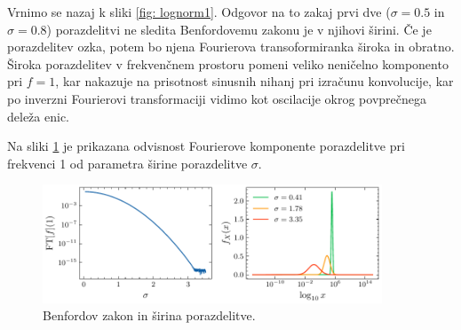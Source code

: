 \documentclass[11pt, oneside]{article}
\theoremstyle{definition}
\begin{document}
Vrnimo se nazaj k sliki \ref{fig: lognorm1}. Odgovor na to zakaj prvi dve ($\sigma=0.5$ in $\sigma=0.8$)
porazdelitvi ne sledita Benfordovemu zakonu je v njihovi širini. Če je porazdelitev ozka, potem bo njena
Fourierova transoformiranka široka in obratno. Široka porazdelitev v frekvenčnem prostoru
pomeni veliko neničelno komponento pri $f=1$, kar nakazuje na prisotnost sinusnih nihanj pri izračunu
konvolucije, kar po inverzni Fourierovi transformaciji vidimo kot oscilacije okrog povprečnega deleža enic.

Na sliki \ref{fig: lognorm_sigma} je prikazana odvisnost Fourierove komponente porazdelitve pri frekvenci 1 od
parametra širine porazdelitve $\sigma$. 

\vspace*{-0.2cm}

\begin{figure}[h!]
    \centering
    \includegraphics[width=0.9\textwidth]{sigma_FT.pdf}
    \caption{Benfordov zakon in širina porazdelitve.}
    \label{fig: lognorm_sigma}
\end{figure}

\newpage

\vspace*{1cm}
\end{document}
